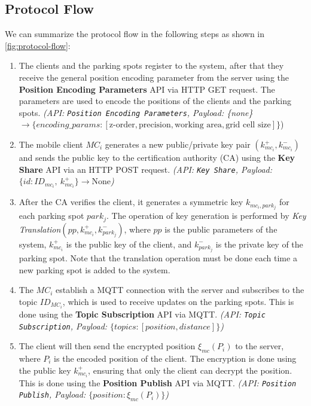 \subsection{Protocol Flow}

We can summarize the protocol flow in the following steps as shown in \cref{fig:protocol-flow}:

\begin{enumerate}
    \item The clients and the parking spots register to the system, after that they receive the general position encoding parameter from the server using the \textbf{Position Encoding Parameters} API via HTTP GET request. The parameters are used to encode the positions of the clients and the parking spots. \emph{(API: \texttt{Position Encoding Parameters}, Payload: \{none\} $\to \{encoding\_params: [\text{z-order}, \text{precision}, \text{working area}, \text{grid cell size}]\}$})
    \item The mobile client $MC_i$ generates a new public/private key pair $(k_{mc_i}^+, k_{mc_i}^-)$ and sends the public key to the certification authority (CA) using the \textbf{Key Share} API via an HTTP POST request. \emph{(API: \texttt{Key Share}, Payload: $\{id: ID_{mc_i},\ k_{mc_i}^+\} \to { \text{None} }$)}
    \item After the CA verifies the client, it generates a symmetric key $k_{mc_i, park_j}$ for each parking spot $park_j$. The operation of key generation is performed by \emph{Key Translation}$(pp, k_{mc_i}^+, k_{park_j}^-)$, where $pp$ is the public parameters of the system, $k_{mc_i}^+$ is the public key of the client, and $k_{park_j}^-$ is the private key of the parking spot. Note that the translation operation must be done each time a new parking spot is added to the system.
    \item The $MC_i$ establish a MQTT connection with the server and subscribes to the topic $ID_{MC_i}$, which is used to receive updates on the parking spots. This is done using the \textbf{Topic Subscription} API via MQTT. \emph{(API: \texttt{Topic Subscription}, Payload: $\{topics: [position, distance]\}$)}
    \item The client will then send the encrypted position $\xi_{mc}(P_i)$ to the server, where $P_i$ is the encoded position of the client. The encryption is done using the public key $k_{mc_i}^+$, ensuring that only the client can decrypt the position. This is done using the \textbf{Position Publish} API via MQTT. \emph{(API: \texttt{Position Publish}, Payload: $\{position: \xi_{mc}(P_i)\}$)}

\end{enumerate}

